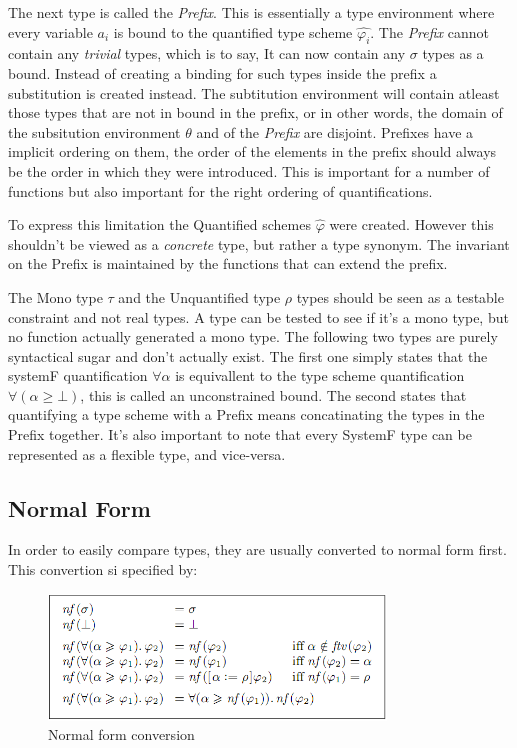 \documentclass[12pt, a4paper, oneside]{article}
\begin{document}
The next type is called the \emph{Prefix}. This is essentially a type environment where every variable $a_i$ is bound to the quantified type scheme $\hat{\varphi_i}$. The \emph{Prefix} cannot contain any \emph{trivial} types, which is to say, It can now contain any $\sigma$ types as a bound. Instead of creating a binding for such types inside the prefix a substitution is created instead. The subtitution environment will contain atleast those types that are not in bound in the prefix, or in other words, the domain of the subsitution environment $\theta$ and of the \emph{Prefix} are disjoint. Prefixes have a implicit ordering on them, the order of the elements in the prefix should always be the order in which they were introduced. This is important for a number of functions but also important for the right ordering of quantifications.

To express this limitation the Quantified schemes $\hat{\varphi}$ were created. However this shouldn't be viewed as a \emph{concrete} type, but rather a type synonym. The invariant on the Prefix is maintained by the functions that can extend the prefix. 

The Mono type $\tau$ and the Unquantified type $\rho$ types should be seen as a testable constraint and not real types. A type can be tested to see if it's a mono type, but no function actually generated a mono type. The following two types are purely syntactical sugar and don't actually exist. The first one simply states that the systemF quantification $\forall \alpha$ is equivallent to the type scheme quantification $\forall(\alpha \geq \bot)$, this is called an unconstrained bound. The second states that quantifying a type scheme with a Prefix means concatinating the types in the Prefix together. It's also important to note that every SystemF type can be represented as a flexible type, and vice-versa.

\subsection{Normal Form}
In order to easily compare types, they are usually converted to normal form first. This convertion si specified by:

\begin{figure}[h!]
  \centering
    \includegraphics[width=0.8\textwidth]{nf}
  \caption{Normal form conversion}
\end{figure}
\end{document}
